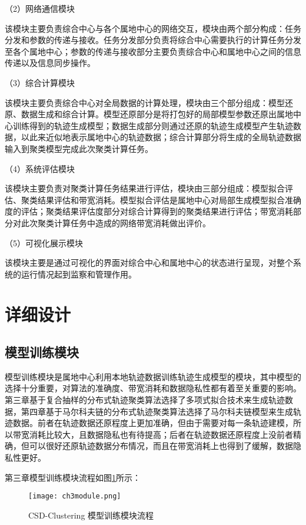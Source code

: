 （2）网络通信模块

该模块主要负责综合中心与各个属地中心的网络交互，模块由两个部分构成：任务分发和参数的传递与接收。任务分发部分负责将综合中心需要执行的计算任务分发至各个属地中心；参数的传递与接收部分主要负责综合中心和属地中心之间的信息传递以及信息同步操作。

（3）综合计算模块

该模块主要负责综合中心对全局数据的计算处理，模块由三个部分组成：模型还原、数据生成和综合计算。模型还原部分是将打包好的局部模型参数还原出属地中心训练得到的轨迹生成模型；数据生成部分则通过还原的轨迹生成模型产生轨迹数据，以此来近似地表示属地中心的轨迹数据；综合计算部分将生成的全局轨迹数据输入到聚类模型完成此次聚类计算任务。

（4）系统评估模块

该模块主要负责对聚类计算任务结果进行评估，模块由三部分组成：模型拟合评估、聚类结果评估和带宽消耗。模型拟合评估是属地中心对局部生成模型拟合准确度的评估；聚类结果评估度部分对综合计算得到的聚类结果进行评估；带宽消耗部分对此次聚类计算任务中造成的网络带宽消耗做出评价。

（5）可视化展示模块

该模块主要是通过可视化的界面对综合中心和属地中心的状态进行呈现，对整个系统的运行情况起到监察和管理作用。

\section{详细设计}

\subsection{模型训练模块}
模型训练模块是属地中心利用本地轨迹数据训练轨迹生成模型的模块，其中模型的选择十分重要，对算法的准确度、带宽消耗和数据隐私性都有着至关重要的影响。第三章基于复合抽样的分布式轨迹聚类算法选择了多项式拟合技术来生成轨迹数据，第四章基于马尔科夫链的分布式轨迹聚类算法选择了马尔科夫链模型来生成轨迹数据。前者在轨迹数据还原程度上更加准确，但由于需要对每一条轨迹建模，所以带宽消耗比较大，且数据隐私也有待提高；后者在轨迹数据还原程度上没前者精确，但可以很好还原轨迹数据分布情况，而且在带宽消耗上也得到了缓解，数据隐私性更好。

第三章模型训练模块流程如图\ref{ch3module}所示：
\begin{figure}[H]
	\texttt{[image: ch3module.png]}
	\caption{CSD-Clustering 模型训练模块流程}
	\label{ch3module}
\end{figure}

